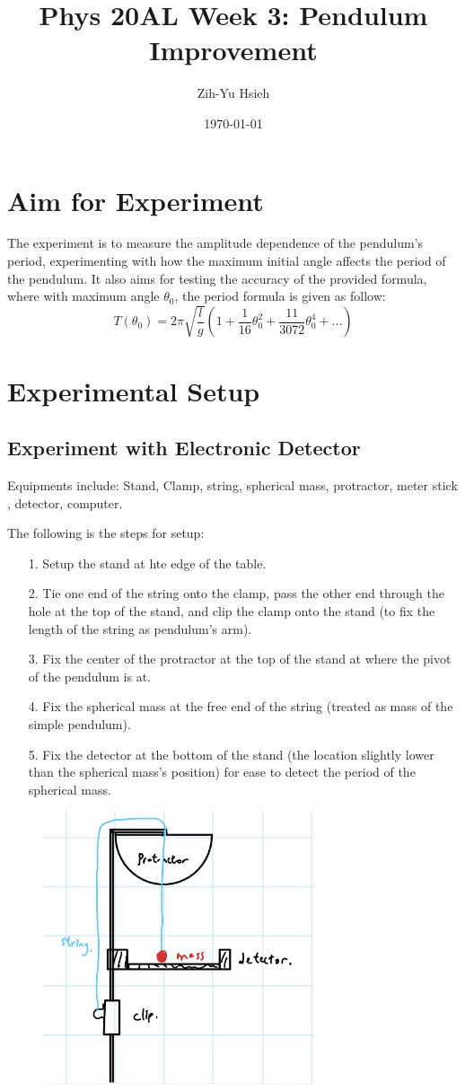 \documentclass{article}
\title{Phys 20AL Week 3: Pendulum Improvement}
\author{Zih-Yu Hsieh}
\date{\today}
\begin{document}
\maketitle

\section{Aim for Experiment}
The experiment is to measure the amplitude dependence of the pendulum's period, experimenting with how the maximum initial angle affects the period of the pendulum. It also aims for testing the accuracy of the provided formula, where with maximum angle $\theta_0$, the period formula is given as follow:
$$T(\theta_0)=2\pi\sqrt{\frac{l}{g}}\left(1+\frac{1}{16}\theta_0^2+\frac{11}{3072}\theta_0^4+...\right)$$ 

\section{Experimental Setup}
\subsection{Experiment with Electronic Detector}
Equipments include: Stand, Clamp, string, spherical mass, protractor, meter stick , detector, computer.

The following is the steps for setup:
\begin{itemize}
    \item[1.] Setup the stand at hte edge of the table.
    \item[2.] Tie one end of the string onto the clamp, pass the other end through the hole at the top of the stand, and clip the clamp onto the stand (to fix the length of the string as pendulum's arm).
    \item[3.] Fix the center of the protractor at the top of the stand at where the pivot of the pendulum is at.
    \item[4.] Fix the spherical mass at the free end of the string (treated as mass of the simple pendulum).
    \item[5.] Fix the detector at the bottom of the stand (the location slightly lower than the spherical mass's position) for ease to detect the period of the spherical mass.
\end{itemize}
\begin{figure}[h!]
    \centering
    \includegraphics[width=80mm]{sketch_detector.jpg}
\end{figure}
\end{document}
